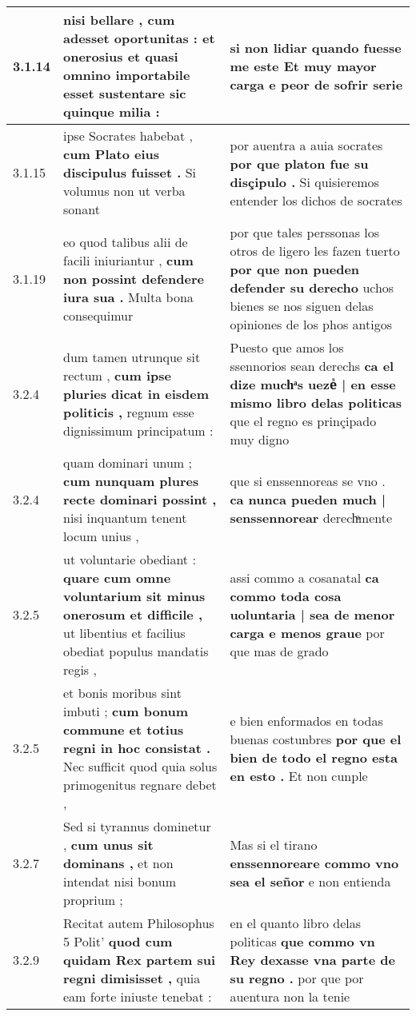 \begin{tabular}{|p{1cm}|p{6.5cm}|p{6.5cm}|}
3.1.14 & nisi bellare , \textbf{ cum adesset oportunitas : } et onerosius et quasi omnino importabile esset sustentare sic quinque milia : & si non lidiar \textbf{ quando fuesse me este } Et muy mayor carga e peor de sofrir serie \\\hline
3.1.15 & ipse Socrates habebat , \textbf{ cum Plato eius discipulus fuisset . } Si volumus non ut verba sonant & por auentra a auia socrates \textbf{ por que platon fue su disçipulo . } Si quisieremos entender los dichos de socrates \\\hline
3.1.19 & eo quod talibus alii de facili iniuriantur , \textbf{ cum non possint defendere iura sua . } Multa bona consequimur & por que tales perssonas los otros de ligero les fazen tuerto \textbf{ por que non pueden defender su derecho } uchos bienes se nos siguen delas opiniones de los phos antigos \\\hline
3.2.4 & dum tamen utrunque sit rectum , \textbf{ cum ipse pluries dicat in eisdem politicis , } regnum esse dignissimum principatum : & Puesto que amos los ssennorios sean derechs \textbf{ ca el dize muchͣs uezeᷤ | en esse mismo libro delas politicas } que el regno es prinçipado muy digno \\\hline
3.2.4 & quam dominari unum ; \textbf{ cum nunquam plures recte dominari possint , } nisi inquantum tenent locum unius , & que si enssennoreas se vno . \textbf{ ca nunca pueden much | senssennorear } derechͣmente \\\hline
3.2.5 & ut voluntarie obediant : \textbf{ quare cum omne voluntarium sit minus onerosum et difficile , } ut libentius et facilius obediat populus mandatis regis , & assi commo a cosanatal \textbf{ ca commo toda cosa uoluntaria | sea de menor carga e menos graue } por que mas de grado \\\hline
3.2.5 & et bonis moribus sint imbuti ; \textbf{ cum bonum commune et totius regni in hoc consistat . } Nec sufficit quod quia solus primogenitus regnare debet , & e bien enformados en todas buenas costunbres \textbf{ por que el bien de todo el regno esta en esto . } Et non cunple \\\hline
3.2.7 & Sed si tyrannus dominetur , \textbf{ cum unus sit dominans , } et non intendat nisi bonum proprium ; & Mas si el tirano \textbf{ enssennoreare commo vno sea el señor } e non entienda \\\hline
3.2.9 & Recitat autem Philosophus 5 Polit’ \textbf{ quod cum quidam Rex partem sui regni dimisisset , } quia eam forte iniuste tenebat : & en el quanto libro delas politicas \textbf{ que commo vn Rey dexasse vna parte de su regno . } por que por auentura non la tenie \\\hline

\end{tabular}
